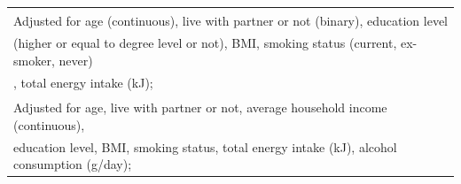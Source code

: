 \begin{table}[H]
\begin{tabular}[t]{lccccc}
		\multicolumn{6}{l}{{\scriptsize \textsuperscript{\dag} Adjusted for age (continuous), live with partner or not (binary), education level}}\\ 
		\multicolumn{6}{l}{{\scriptsize (higher or equal to degree level or not), BMI, smoking status (current, ex-smoker, never)}}\\
		\multicolumn{6}{l}{{\scriptsize , total energy intake (kJ);}}\\
		\multicolumn{6}{l}{{\scriptsize \textsuperscript{\ddag} Adjusted for age, live with partner or not, average household income (continuous),}}\\ 
		\multicolumn{6}{l}{{\scriptsize education level, BMI, smoking status, total energy intake (kJ), alcohol consumption (g/day);}}\\
	\end{tabular}
\end{table}
\vspace{-0.5cm}



